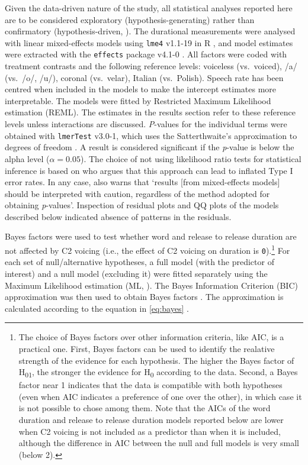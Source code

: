 \documentclass[charis]{glossa}
\begin{document}
Given the data-driven nature of the study, all statistical analyses
reported here are to be considered exploratory (hypothesis-generating)
rather than confirmatory (hypothesis-driven,
\citealt{kerr1998, gelman2013, roettger2018}). The durational
measurements were analysed with linear mixed-effects models using
\texttt{lme4} v1.1-19 in R \citep{bates2015}, and model estimates were
extracted with the \texttt{effects} package v4.1-0 \citep{fox2003}. All
factors were coded with treatment contrasts and the following reference
levels: voiceless (vs.~voiced), /a/ (vs.~/o/, /u/), coronal (vs.~velar),
Italian (vs.~Polish). Speech rate has been centred when included in the
models to make the intercept estimates more interpretable. The models
were fitted by Restricted Maximum Likelihood estimation (REML). The
estimates in the results section refer to these reference levels unless
interactions are discussed. \emph{P}-values for the individual terms
were obtained with \texttt{lmerTest} v3.0-1, which uses the
Satterthwaite's approximation to degrees of freedom
\citep{kuznetsova2017, luke2017}. A result is considered significant if
the \emph{p}-value is below the alpha level (\(\alpha = 0.05\)). The
choice of not using likelihood ratio tests for statistical inference is
based on \citet{luke2017} who argues that this approach can lead to
inflated Type I error rates. In any case, \citet[1501]{luke2017} also
warns that `results {[}from mixed-effects models{]} should be
interpreted with caution, regardless of the method adopted for obtaining
\textit{p}-values'. Inspection of residual plots and QQ plots of the
models described below indicated absence of patterns in the residuals.

Bayes factors were used to test whether word and release to release
duration are not affected by C2 voicing (i.e., the effect of C2 voicing
on duration is
\texttt{0}).\footnote{The choice of Bayes factors over other information criteria, like AIC, is a practical one. First, Bayes factors can be used to identify the realative strength of the evidence for each hypothesis. The higher the Bayes factor of H\textsubscript{01}, the stronger the evidence for H\textsubscript{0} according to the data. Second, a Bayes factor near 1 indicates that the data is compatible with both hypotheses (even when AIC indicates a preference of one over the other), in which case it is not possible to chose among them. Note that the AICs of the word duration and release to release duration models reported below are lower when C2 voicing is not included as a predictor than when it is included, although the difference in AIC between the null and full models is very small (below 2).}
For each set of null/alternative hypotheses, a full model (with the
predictor of interest) and a null model (excluding it) were fitted
separately using the Maximum Likelihood estimation (ML,
\citealt[34]{bates2015}). The Bayes Information Criterion (BIC)
approximation was then used to obtain Bayes factors
\citep{raftery1995, raftery1999, wagenmakers2007, jarosz2014}. The
approximation is calculated according to the equation in \ref{eq:bayes}
\citep[796]{wagenmakers2007}.
\end{document}
